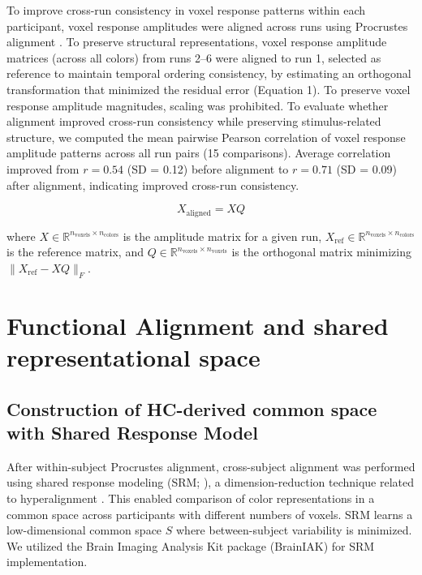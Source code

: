 To improve cross-run consistency in voxel response patterns within each participant, voxel response amplitudes were aligned across runs using Procrustes alignment \cite{gower1975}. To preserve structural representations, voxel response amplitude matrices (across all colors) from runs 2--6 were aligned to run 1, selected as reference to maintain temporal ordering consistency, by estimating an orthogonal transformation that minimized the residual error (Equation 1). To preserve voxel response amplitude magnitudes, scaling was prohibited. To evaluate whether alignment improved cross-run consistency while preserving stimulus-related structure, we computed the mean pairwise Pearson correlation of voxel response amplitude patterns across all run pairs (15 comparisons). Average correlation improved from $r = 0.54$ (SD = 0.12) before alignment to $r = 0.71$ (SD = 0.09) after alignment, indicating improved cross-run consistency.

\begin{equation}
X_{\text{aligned}} = XQ
\end{equation}

where $X \in \mathbb{R}^{n_{\text{voxels}} \times n_{\text{colors}}}$ is the amplitude matrix for a given run, $X_{\text{ref}} \in \mathbb{R}^{n_{\text{voxels}} \times n_{\text{colors}}}$ is the reference matrix, and $Q \in \mathbb{R}^{n_{\text{voxels}} \times n_{\text{voxels}}}$ is the orthogonal matrix minimizing $\|X_{\text{ref}} - XQ\|_F$.

\section{Functional Alignment and shared representational space}

\subsection*{Construction of HC-derived common space with Shared Response Model}

After within-subject Procrustes alignment, cross-subject alignment was performed using shared response modeling (SRM; \cite{chen2015}), a dimension-reduction technique related to hyperalignment \cite{haxby2011, guntupalli2016}. This enabled comparison of color representations in a common space across participants with different numbers of voxels. SRM learns a low-dimensional common space $S$ where between-subject variability is minimized. We utilized the Brain Imaging Analysis Kit package (BrainIAK) for SRM implementation.

